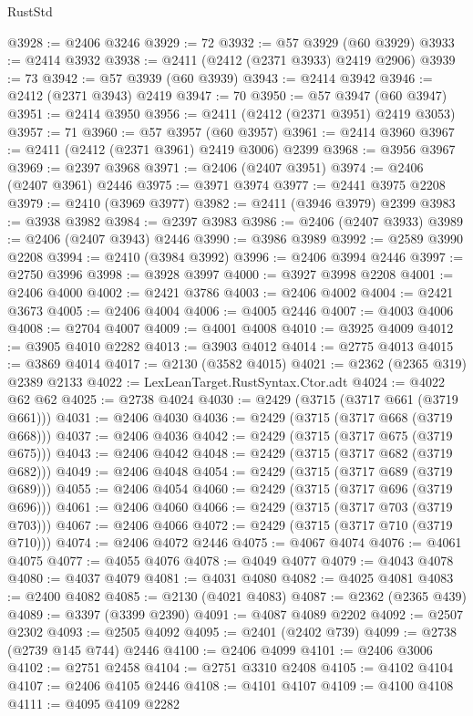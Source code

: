 \begin{lexlean}{RustStd}
\begin{coremodule}
@3928 := @2406 @3246
@3929 := 72
@3932 := @57 @3929 (@60 @3929)
@3933 := @2414 @3932
@3938 := @2411 (@2412 (@2371 @3933) @2419 @2906)
@3939 := 73
@3942 := @57 @3939 (@60 @3939)
@3943 := @2414 @3942
@3946 := @2412 (@2371 @3943) @2419
@3947 := 70
@3950 := @57 @3947 (@60 @3947)
@3951 := @2414 @3950
@3956 := @2411 (@2412 (@2371 @3951) @2419 @3053)
@3957 := 71
@3960 := @57 @3957 (@60 @3957)
@3961 := @2414 @3960
@3967 := @2411 (@2412 (@2371 @3961) @2419 @3006) @2399
@3968 := @3956 @3967
@3969 := @2397 @3968
@3971 := @2406 (@2407 @3951)
@3974 := @2406 (@2407 @3961) @2446
@3975 := @3971 @3974
@3977 := @2441 @3975 @2208
@3979 := @2410 (@3969 @3977)
@3982 := @2411 (@3946 @3979) @2399
@3983 := @3938 @3982
@3984 := @2397 @3983
@3986 := @2406 (@2407 @3933)
@3989 := @2406 (@2407 @3943) @2446
@3990 := @3986 @3989
@3992 := @2589 @3990 @2208
@3994 := @2410 (@3984 @3992)
@3996 := @2406 @3994 @2446
@3997 := @2750 @3996
@3998 := @3928 @3997
@4000 := @3927 @3998 @2208
@4001 := @2406 @4000
@4002 := @2421 @3786
@4003 := @2406 @4002
@4004 := @2421 @3673
@4005 := @2406 @4004
@4006 := @4005 @2446
@4007 := @4003 @4006
@4008 := @2704 @4007
@4009 := @4001 @4008
@4010 := @3925 @4009
@4012 := @3905 @4010 @2282
@4013 := @3903 @4012
@4014 := @2775 @4013
@4015 := @3869 @4014
@4017 := @2130 (@3582 @4015)
@4021 := @2362 (@2365 @319) @2389 @2133
@4022 := LexLeanTarget.RustSyntax.Ctor.adt
@4024 := @4022 @62 @62
@4025 := @2738 @4024
@4030 := @2429 (@3715 (@3717 @661 (@3719 @661)))
@4031 := @2406 @4030
@4036 := @2429 (@3715 (@3717 @668 (@3719 @668)))
@4037 := @2406 @4036
@4042 := @2429 (@3715 (@3717 @675 (@3719 @675)))
@4043 := @2406 @4042
@4048 := @2429 (@3715 (@3717 @682 (@3719 @682)))
@4049 := @2406 @4048
@4054 := @2429 (@3715 (@3717 @689 (@3719 @689)))
@4055 := @2406 @4054
@4060 := @2429 (@3715 (@3717 @696 (@3719 @696)))
@4061 := @2406 @4060
@4066 := @2429 (@3715 (@3717 @703 (@3719 @703)))
@4067 := @2406 @4066
@4072 := @2429 (@3715 (@3717 @710 (@3719 @710)))
@4074 := @2406 @4072 @2446
@4075 := @4067 @4074
@4076 := @4061 @4075
@4077 := @4055 @4076
@4078 := @4049 @4077
@4079 := @4043 @4078
@4080 := @4037 @4079
@4081 := @4031 @4080
@4082 := @4025 @4081
@4083 := @2400 @4082
@4085 := @2130 (@4021 @4083)
@4087 := @2362 (@2365 @439)
@4089 := @3397 (@3399 @2390)
@4091 := @4087 @4089 @2202
@4092 := @2507 @2302
@4093 := @2505 @4092
@4095 := @2401 (@2402 @739)
@4099 := @2738 (@2739 @145 @744) @2446
@4100 := @2406 @4099
@4101 := @2406 @3006
@4102 := @2751 @2458
@4104 := @2751 @3310 @2408
@4105 := @4102 @4104
@4107 := @2406 @4105 @2446
@4108 := @4101 @4107
@4109 := @4100 @4108
@4111 := @4095 @4109 @2282

\end{coremodule}
\end{lexlean}
